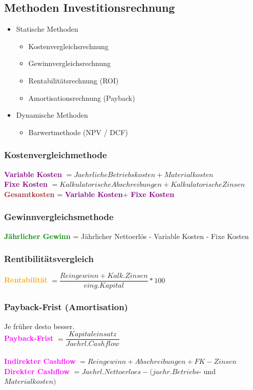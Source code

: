\documentclass[../ZF_Wing.tex]{subfiles}
\begin{document}
\subsection{Methoden Investitionsrechnung}
\begin{itemize}
	\item Statische Methoden
	\begin{itemize}
		\item Kostenvergleichsrechnung
		\item Gewinnvergleichsrechnung
		\item Rentabilitätsrechnung (ROI)
		\item Amortisationsrechnung (Payback)
	\end{itemize}
	\item Dynamische Methoden
	\begin{itemize}
		\item Barwertmethode (NPV / DCF)
	\end{itemize}
\end{itemize}

\subsubsection{Kostenvergleichmethode}
\textbf{\textcolor{purple}{Variable Kosten}} $ = Jaehrliche Betriebskosten + Materialkosten$\\
\textbf{\textcolor{purple}{Fixe Kosten}} $ = Kalkulatorische Abschreibungen + Kalkulatorische Zinsen$\\
\textbf{\textcolor{brown}{Gesamtkosten}} = \textbf{\textcolor{purple}{Variable Kosten}}+ \textbf{\textcolor{purple}{Fixe Kosten}}

\subsubsection{Gewinnvergleichsmethode}
\textbf{\textcolor{green}{Jährlicher Gewinn}} = Jährlicher Nettoerlös - Variable Kosten - Fixe Kosten\\



\subsubsection{Rentibilitätsvergleich}
\textbf{\textcolor{orange}{Rentabilität}} $= \dfrac{Reingewinn + Kalk. Zinsen}{eing.Kapital}*100$ 

\subsubsection{Payback-Frist (Amortisation)}
Je früher desto besser.\\
\textbf{\textcolor{magenta}{Payback-Frist}} $= \dfrac{Kapitaleinsatz}{Jaehrl.Cashflow}$ \\\\
\textbf{\textcolor{magenta}{Indirekter Cashflow}} $= Reingewinn + Abschreibungen + FK-Zinsen$\\ 
\textbf{\textcolor{magenta}{Direkter Cashflow}} $= Jaehrl.Nettoerloes -(jaehr.Betriebs$- und $Materialkosten)$\\ 
\end{document}
